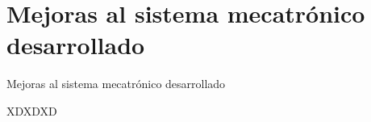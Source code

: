 \section{Mejoras al sistema  mecatr\'onico desarrollado}
\label{Mejoras_SM_desarrollado}

Mejoras al sistema  mecatr\'onico desarrollado
\par

XDXDXD
